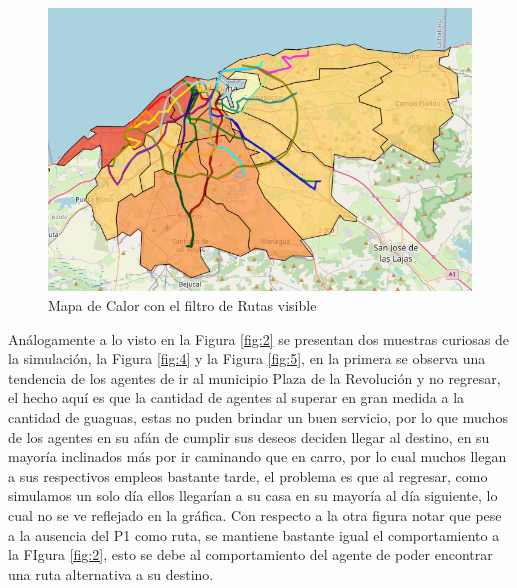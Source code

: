 \documentclass[a4paper,12pt]{article}
\begin{document}
\begin{figure}[H]
    \centering
    \includegraphics[width=1\textwidth]{imgs/mc.png}
    \caption{Mapa de Calor con el filtro de Rutas visible}
    \label{fig:3}
\end{figure}

An\'alogamente a lo visto en la Figura \ref{fig:2} se presentan dos muestras curiosas de la simulaci\'on, la Figura \ref{fig:4} y la Figura \ref{fig:5}, en la primera se observa una tendencia de los agentes de ir al municipio Plaza de la Revoluci\'on y no regresar, el hecho aqu\'i es que la cantidad de agentes al superar en gran medida a la cantidad de guaguas, estas no puden brindar un buen servicio, por lo que muchos de los agentes en su af\'an de cumplir sus deseos deciden llegar al destino, en su mayor\'ia inclinados m\'as por ir caminando que en carro, por lo cual muchos llegan a sus respectivos empleos bastante tarde, el problema es que al regresar, como simulamos un solo d\'ia ellos llegar\'ian a su casa en su mayor\'ia al d\'ia siguiente, lo cual no se ve reflejado en la gr\'afica. Con respecto a la otra figura notar que pese a la ausencia del P1 como ruta, se mantiene bastante igual el comportamiento a la FIgura \ref{fig:2}, esto se debe al comportamiento del agente de poder encontrar una ruta alternativa a su destino.
\end{document}
